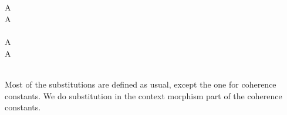 \documentclass{acm_proc_article-sp}
\begin{document}
{\begin{code}
\\
%
\\
%
\\
\> \AgdaSymbol{:}    \AgdaSymbol{:} \AgdaSymbol{\}\{} \AgdaSymbol{:}   \AgdaSymbol{\}\{} \AgdaSymbol{:}   \AgdaSymbol{\}\{} \AgdaSymbol{:}   \AgdaSymbol{\}\{} \AgdaSymbol{:}  \AgdaSymbol{\}}\<%
\\
\>[0]\<[7]%
\>[7]     \<%
\\
\>[0]\<[7]%
\>[7]   \AgdaSymbol{(}  \AgdaSymbol{)}    \<%
\\
\>  \AgdaSymbol{=}   \AgdaSymbol{(}      \AgdaSymbol{\_)} \AgdaSymbol{)}\<%
\\
%
\\
%
\\
\> \AgdaSymbol{\{}A \AgdaSymbol{=} \AgdaInductiveConstructor{*}\AgdaSymbol{\}} \AgdaSymbol{=} \<%
\\
\> \AgdaSymbol{\{}A \AgdaSymbol{=}  \AgdaSymbol{\{}\AgdaSymbol{\}}  \AgdaSymbol{\}} \AgdaSymbol{=}  \AgdaSymbol{(} \AgdaSymbol{\_)} \AgdaSymbol{(} \AgdaSymbol{\_)} \<[51]%
\>[51]\<%
\\
%
\\
\> \AgdaSymbol{\{}A \AgdaSymbol{=} \AgdaInductiveConstructor{*}\AgdaSymbol{\}} \AgdaSymbol{=} \<%
\\
\> \AgdaSymbol{\{}A \AgdaSymbol{=}  \AgdaSymbol{\{}\AgdaSymbol{\}}  \AgdaSymbol{\}} \AgdaSymbol{=}  \<[34]%
\>[34]\AgdaSymbol{(} \AgdaSymbol{\_)} \AgdaSymbol{(} \AgdaSymbol{\_)}\<%
\\
%
\\
\>\<\end{code}
}
Most of the substitutions are defined as usual, except the one for coherence constants. We do
substitution in the context morphism part of the coherence constants.
\end{document}
